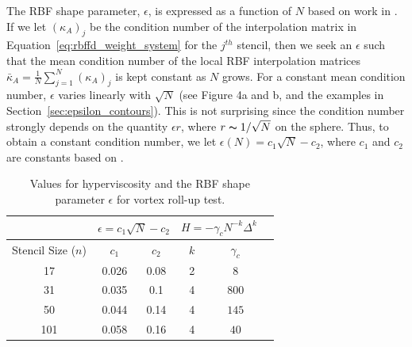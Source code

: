 \documentclass{report}
\begin{document}
The RBF shape parameter, $\epsilon$, is expressed as a function of $N$ based on work in \cite{FlyerLehto11}. If we let $(\kappa_A)_j$ be the condition number of the interpolation matrix in Equation~\ref{eq:rbffd_weight_system} for the $j^{th}$ stencil, then we seek an $\epsilon$ such that the mean condition number of the local RBF interpolation matrices $\bar{\kappa}_A = \frac{1}{N}\sum_{j=1}^N (\kappa_A)_j$ is kept constant as $N$ grows. For a constant mean condition number, $\epsilon$ varies linearly with $\sqrt{N}$ (see \cite{FlyerLehto11} Figure 4a and b, and the examples in Section~\ref{sec:epsilon_contours}). This is not surprising since the condition number strongly depends on the quantity $\epsilon r$, where $r\thicksim1/\sqrt{N}$ on the sphere. Thus, to obtain a constant condition number, we let $\epsilon (N) = c_1 \sqrt{N} - c_2$, where $c_1$ and $c_2$ are constants based on \cite{FlyerLehto11}.

\begin{table}[t]
\caption{Values for hyperviscosity and the RBF shape parameter $\epsilon$ for vortex roll-up test.}
\begin{center}
\begin{tabular}{|c|c|c|c|c|c|}
\hline		     & \multicolumn{2}{c|}{$\epsilon = c_1 \sqrt{N} - c_2$} & \multicolumn{2}{c|}{$H = -\gamma_{c} N^{-k} \Delta^{k}$ } \\ \hline
Stencil Size ($n$) & $c_{1}$ & $c_{2}$ & $k$ & $\gamma_c$ \\ \hline
17 & 0.026 & 0.08 & 2 & $8$ \\
31 & 0.035 & 0.1  & 4 & $800$ \\
50 & 0.044 & 0.14 & 4 & $145$ \\
101 & 0.058 & 0.16 & 4 & $40$ \\ \hline
\end{tabular}
\end{center}
\label{tbl:vortex_hv_params}
\end{table}
\end{document}
